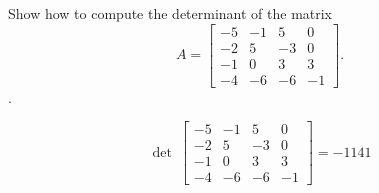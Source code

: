 
\begin{exerciseStatement}


Show how to compute the determinant of the matrix \[A= \left[\begin{array}{cccc}
-5 & -1 & 5 & 0 \\
-2 & 5 & -3 & 0 \\
-1 & 0 & 3 & 3 \\
-4 & -6 & -6 & -1
\end{array}\right] .\].


\end{exerciseStatement}
    
\begin{exerciseAnswer} 
\[\operatorname{det}\  \left[\begin{array}{cccc}
-5 & -1 & 5 & 0 \\
-2 & 5 & -3 & 0 \\
-1 & 0 & 3 & 3 \\
-4 & -6 & -6 & -1
\end{array}\right] = -1141 \]
\end{exerciseAnswer}
    

